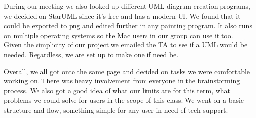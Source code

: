\documentclass[12pt, letterpaper]{article}
\begin{document}
During our meeting we also looked up different UML diagram creation programs, we decided on StarUML since it’s free and has a modern UI. We found that it could be exported to png and edited further in any painting program. It also runs on multiple operating systems so the Mac users in our group can use it too. Given the simplicity of our project we emailed the TA to see if a UML would be needed. Regardless, we are set up to make one if need be. 

Overall, we all got onto the same page and decided on tasks we were comfortable working on.  There was heavy involvement from everyone in the brainstorming process. We also got a good idea of what our limits are for this term, what problems we could solve for users in the scope of this class. We went on a basic structure and flow, something simple for any user in need of tech support. 
\end{document}
